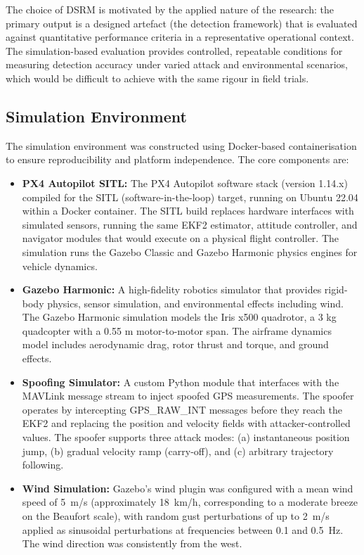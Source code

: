 \documentclass[electronics,article,accept,moreauthors]{Definitions/mdpi}
\begin{document}
The choice of DSRM is motivated by the applied nature of the research: the primary output is a designed artefact (the detection framework) that is evaluated against quantitative performance criteria in a representative operational context. The simulation-based evaluation provides controlled, repeatable conditions for measuring detection accuracy under varied attack and environmental scenarios, which would be difficult to achieve with the same rigour in field trials.

\subsection{Simulation Environment}
\label{sec:simulation}

The simulation environment was constructed using Docker-based containerisation to ensure reproducibility and platform independence. The core components are:

\begin{itemize}
    \item \textbf{PX4 Autopilot SITL:} The PX4 Autopilot software stack (version 1.14.x) compiled for the SITL (software-in-the-loop) target, running on Ubuntu 22.04 within a Docker container. The SITL build replaces hardware interfaces with simulated sensors, running the same EKF2 estimator, attitude controller, and navigator modules that would execute on a physical flight controller. The simulation runs the Gazebo Classic and Gazebo Harmonic physics engines for vehicle dynamics.
    
    \item \textbf{Gazebo Harmonic:} A high-fidelity robotics simulator that provides rigid-body physics, sensor simulation, and environmental effects including wind. The Gazebo Harmonic simulation models the Iris x500 quadrotor, a 3 kg quadcopter with a 0.55 m motor-to-motor span. The airframe dynamics model includes aerodynamic drag, rotor thrust and torque, and ground effects.
    
    \item \textbf{Spoofing Simulator:} A custom Python module that interfaces with the MAVLink message stream to inject spoofed GPS measurements. The spoofer operates by intercepting GPS\_RAW\_INT messages before they reach the EKF2 and replacing the position and velocity fields with attacker-controlled values. The spoofer supports three attack modes: (a) instantaneous position jump, (b) gradual velocity ramp (carry-off), and (c) arbitrary trajectory following.
    
    \item \textbf{Wind Simulation:} Gazebo's wind plugin was configured with a mean wind speed of 5~m/s (approximately 18~km/h, corresponding to a moderate breeze on the Beaufort scale), with random gust perturbations of up to 2~m/s applied as sinusoidal perturbations at frequencies between 0.1 and 0.5~Hz. The wind direction was consistently from the west.
\end{itemize}
\end{document}
